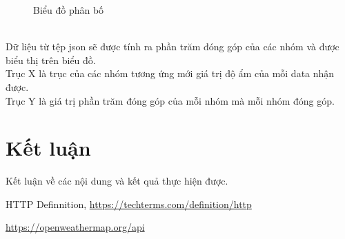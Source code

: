 \documentclass[a4paper]{article}
\begin{document}
\begin{enumerate}
\begin{figure}[htp]
        		\caption{Biểu đồ phân bố}
       		 \label{fig:distributionchartApp}
    	\end{figure}\\
	Dữ liệu từ tệp json sẽ được tính ra phần trăm đóng góp của các nhóm và được biểu thị trên biểu đồ.\\
	Trục X là trục của các nhóm tương ứng mới giá trị độ ẩm của mỗi data nhận được.\\
	Trục Y là giá trị phần trăm đóng góp của mỗi nhóm mà mỗi nhóm đóng góp.\\
	\end{enumerate}
\section{Kết luận}
	Kết luận về các nội dung và kết quả thực hiện được.


\begin{thebibliography}{80}


HTTP Definnition, \url{https://techterms.com/definition/http}


\url{https://openweathermap.org/api}


\end{thebibliography}
\end{document}
